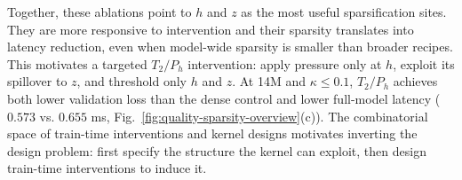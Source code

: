 Together, these ablations point to \(h\) and \(z\) as the most useful sparsification sites. They are more responsive to intervention and their sparsity translates into latency reduction, even when model-wide sparsity is smaller than broader recipes. This motivates a targeted \(T_2/P_h\) intervention: apply pressure only at \(h\), exploit its spillover to \(z\), and threshold only \(h\) and \(z\). At 14M and \(\kappa \leq 0.1\), \(T_2/P_h\) achieves both lower validation loss than the dense control and lower full-model latency (\(0.573\) vs. \(0.655\) ms, Fig.~\ref{fig:quality-sparsity-overview}(c)). The combinatorial space of train-time interventions and kernel designs motivates inverting the design problem: first specify the structure the kernel can exploit, then design train-time interventions to induce it.






